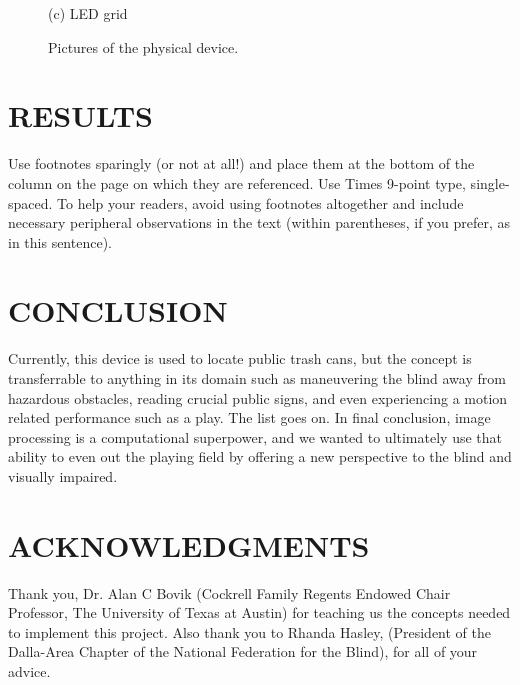 \documentclass{article}
\begin{document}
\begin{center}
\begin{figure}[ht]
\begin{minipage}[b]{0.48\linewidth}
  \centerline{(c) LED grid}\medskip
\end{minipage}
%
\caption{Pictures of the physical device.}
\label{figures}
%
\end{figure}
\end{center}



\section{RESULTS}
\label{sec:results}

Use footnotes sparingly (or not at all!) and place them at the bottom of the
column on the page on which they are referenced. Use Times 9-point type,
single-spaced. To help your readers, avoid using footnotes altogether and
include necessary peripheral observations in the text (within parentheses, if
you prefer, as in this sentence).



\section{CONCLUSION}
\label{sec:conclusion}

Currently, this device is used to locate public trash cans, but the concept is transferrable to anything in its domain such as maneuvering the blind away from hazardous obstacles, reading crucial public signs, and even experiencing a motion related performance such as a play. The list goes on. In final conclusion, image processing is a computational superpower, and we wanted to ultimately use that ability to even out the playing field by offering a new perspective to the blind and visually impaired. 

\section{ACKNOWLEDGMENTS}
\label{sec:ack}

Thank you, Dr. Alan C Bovik (Cockrell Family Regents Endowed Chair Professor, The University of Texas at Austin) for teaching us the concepts needed to implement this project. Also thank you to Rhanda Hasley, (President of the Dalla-Area Chapter of the National Federation for the Blind), for all of your advice.






\end{document}
